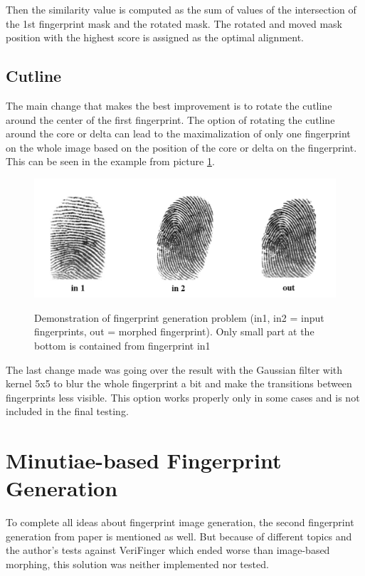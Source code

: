 Then the similarity value is computed as the sum of values of the intersection of the 1st fingerprint mask and the rotated mask. The rotated and moved mask position with the highest score is assigned as the optimal alignment.


\subsection{Cutline}
The main change that makes the best improvement is to rotate the cutline around the center of the first fingerprint. The option of rotating the cutline around the core or delta can lead to the maximalization of only one fingerprint on the whole image based on the position of the core or delta on the fingerprint. This can be seen in the example from picture \ref{fig:bad_show}.

\begin{figure}[H]
    \centering
        {\includegraphics[width=1\linewidth]{obrazky-figures/bad_show.png}}\\
        \caption{Demonstration of fingerprint generation problem (in1, in2 = input fingerprints, out = morphed fingerprint). Only small part at the bottom is contained from fingerprint in1}
        \label{fig:bad_show}
\end{figure}

The last change made was going over the result with the Gaussian filter with kernel 5x5 to blur the whole fingerprint a bit and make the transitions between fingerprints less visible. This option works properly only in some cases and is not included in the final testing.

\section{Minutiae-based Fingerprint Generation}
To complete all ideas about fingerprint image generation, the second fingerprint generation from paper \cite{morphing_paper} is mentioned as well. But because of different topics and the author’s tests against VeriFinger which ended worse than image-based morphing, this solution was neither implemented nor tested. 

